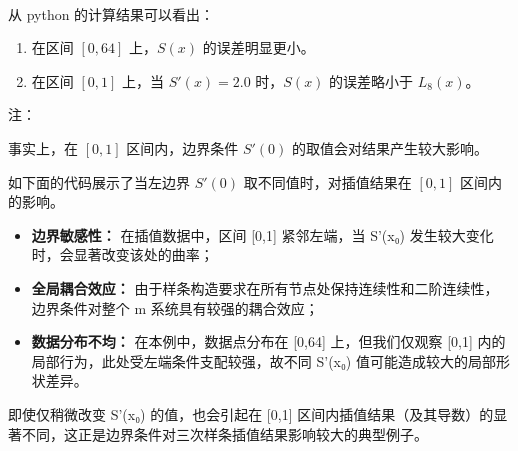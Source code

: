 \documentclass[11pt]{article}
\providecommand{\tightlist}{%
      \setlength{\itemsep}{0pt}\setlength{\parskip}{0pt}}
\begin{document}
    \begin{center}
    \end{center}
    { \hspace*{\fill} \\}
    
    从 python 的计算结果可以看出：

\begin{enumerate}
\def\labelenumi{\arabic{enumi}.}
\tightlist
\item
  在区间 \([0, 64]\) 上，\(S(x)\) 的误差明显更小。
\item
  在区间 \([0, 1]\) 上，当 \(S'(x) = 2.0\) 时，\(S(x)\) 的误差略小于
  \(L_8(x)\)。
\end{enumerate}

注：

事实上，在 \([0, 1]\) 区间内，边界条件 \(S'(0)\)
的取值会对结果产生较大影响。

如下面的代码展示了当左边界 \(S'(0)\) 取不同值时，对插值结果在 \([0, 1]\)
区间内的影响。

\begin{itemize}
\tightlist
\item
  \textbf{边界敏感性：} 在插值数据中，区间 {[}0,1{]} 紧邻左端，当 S'(x₀)
  发生较大变化时，会显著改变该处的曲率；
\item
  \textbf{全局耦合效应：}
  由于样条构造要求在所有节点处保持连续性和二阶连续性，边界条件对整个 m
  系统具有较强的耦合效应；
\item
  \textbf{数据分布不均：} 在本例中，数据点分布在 {[}0,64{]}
  上，但我们仅观察 {[}0,1{]}
  内的局部行为，此处受左端条件支配较强，故不同 S'(x₀)
  值可能造成较大的局部形状差异。
\end{itemize}

即使仅稍微改变 S'(x₀) 的值，也会引起在 {[}0,1{]}
区间内插值结果（及其导数）的显著不同，这正是边界条件对三次样条插值结果影响较大的典型例子。
\end{document}
